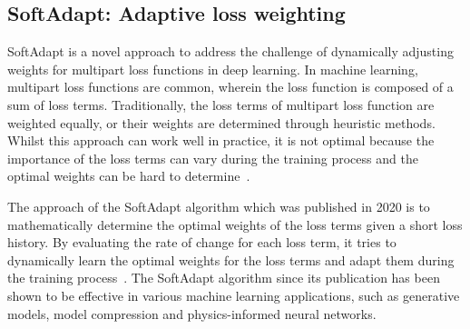 \subsection{SoftAdapt: Adaptive loss weighting} \label{background:softadapt}

SoftAdapt is a novel approach to address the challenge of dynamically adjusting weights for multipart loss functions in deep learning. 
In machine learning, multipart loss functions are common, wherein the loss function is composed of a sum of loss terms. Traditionally, the loss terms of multipart loss function are weighted equally, or their weights are determined through heuristic methods. Whilst this approach can work well in practice, it is not optimal because the importance of the loss terms can vary during the training process and the optimal weights can be hard to determine~\cite{softadapt}.

The approach of the SoftAdapt algorithm which was published in 2020 is to mathematically determine the optimal weights of the loss terms given a short loss history. By evaluating the rate of change for each loss term, it tries to dynamically learn the optimal weights for the loss terms and adapt them during the training process~\cite{softadapt}. The SoftAdapt algorithm since its publication has been shown to be effective in various machine learning applications, such as generative models, model compression and physics-informed neural networks.














